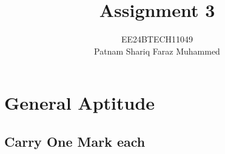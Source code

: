 \documentclass[journal]{IEEEtran}
\numberwithin{equation}{enumi}
\numberwithin{figure}{enumi}
\begin{document}


\title{Assignment 3}
\author{EE24BTECH11049 \\ Patnam Shariq Faraz Muhammed}

{\let\newpage\relax\maketitle}

\section{General Aptitude}
\subsection{Carry One Mark each}
\end{document}
